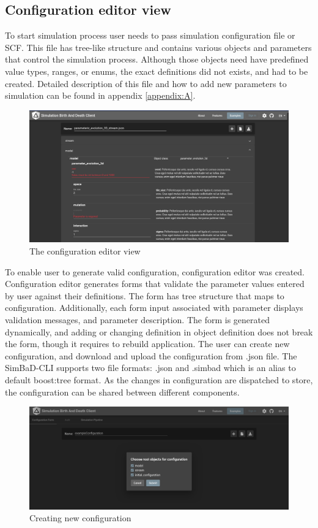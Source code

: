 \subsection{Configuration editor view}
To start simulation process user needs to pass simulation configuration file or SCF. This file has tree-like structure and contains various objects and parameters that control the simulation process. Although those objects need have predefined value types, ranges, or enums, the exact definitions did not exists, and had to be created. Detailed description of this file and how to add new parameters to simulation can be found in appendix \ref{appendix:A}.
\begin{figure}[h!]
	\centering
		\includegraphics[width=0.9\linewidth]{screens/conf-view.png}
	\caption{The configuration editor view}
	\label{fig:conf-view}
\end{figure}
To enable user to generate valid configuration, configuration editor was created. Configuration editor generates forms that validate the parameter values entered by user against their definitions. The form has tree structure that maps to configuration. Additionally, each form input associated with parameter displays validation messages, and parameter description. The form is generated dynamically, and adding or changing definition in object definition does not break the form, though it requires to rebuild application. The user can create new configuration, and download and upload the configuration from .json file.  The SimBaD-CLI supports two file formats: .json and .simbad which is an alias to default boost:tree format. As the changes in configuration are dispatched to store, the configuration can be shared between different components. 
\begin{figure}[h!]
	\centering
		\includegraphics[width=0.9\linewidth]{screens/configuration-view-modal.png}
	\caption{Creating new configuration}
	\label{fig:conf-view-new}
\end{figure}
